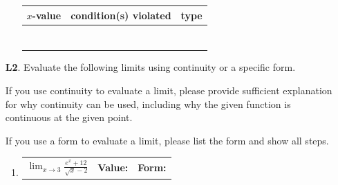 \documentclass[11pt]{article}
\begin{document}
\begin{enumerate}
\begin{enumerate}
\begin{minipage}[t]{0.4\textwidth}
\end{minipage}
\hspace{1em} %
\begin{minipage}[t]{0.40\textwidth}
\vspace{0pt}
\begin{tabular}{|c|c|c|}
    \hline
    \textbf{$x$-value} & \textbf{condition(s) violated} & \textbf{type} \\
    \hline
     & & \\
     & & \\
     & & \\
     & & \\
     & & \\
     & & \\
     & & \\
     \hline
\end{tabular}
\end{minipage}
\end{enumerate}




\newpage


\item[\textbf{L2}.]
Evaluate the following limits using continuity or a specific form.

If you use continuity to evaluate a limit, please provide sufficient explanation for why continuity can be used, including why the given function is continuous at the given point.

If you use a form to evaluate a limit, please list the form and show all steps. 
\vspace{.25em}

\begin{enumerate}
    \item 
    \begin{tabularx}{\textwidth}{lX X}
        $\displaystyle \lim_{x\to 3} \frac{e^x+12}{\sqrt{x}-2}$ & 
        \textbf{Value:} \hrulefill & 
        \textbf{Form:} \hrulefill
    \end{tabularx}
    

\end{enumerate}
\end{enumerate}
\end{document}
